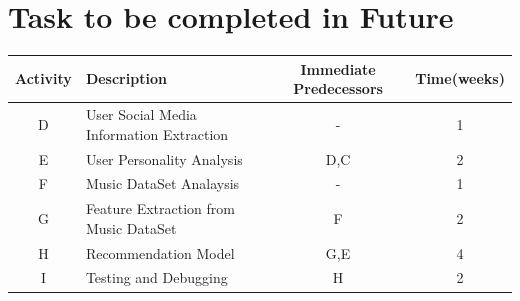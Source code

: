 \documentclass[a4paper, 12pt, onepage]{article}
\begin{document}
      \section{Task to be completed in Future}
	\begin{center}
		\begin{tabular}{|c|l|c|c|}
			\hline
				Activity & Description & Immediate Predecessors&Time(weeks)\\
			\hline
			D&User Social Media Information Extraction&-&1\\
			\hline
			E&User Personality Analysis&D,C&2\\
			\hline
			F&Music DataSet Analaysis&-&1 \\
			\hline
			G&Feature Extraction from Music DataSet&F&2\\
			\hline
			H&Recommendation Model&G,E&4\\
			\hline
			I&Testing and Debugging&H&2\\
			\hline
		\end{tabular}
	\end{center}
\end{document}
